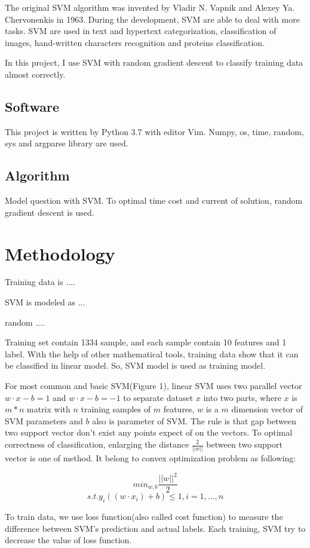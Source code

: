 \documentclass[conference,compsoc]{IEEEtran}
\begin{document}
The original SVM algorithm was invented by Vladir N. Vapnik and
Alexey Ya. Chervonenkis in 1963. During the development, SVM are able to deal
with more tasks. SVM are used in text and hypertext categorization,
classification of images, hand-written characters recognition and proteins
classification.

In this project, I use SVM with random gradient descent to classify training
data almost correctly. 


\subsection{Software}
This project is written by Python 3.7 with editor Vim. Numpy, os, time,
random, sys and argparse library are used.

\subsection{Algorithm}
Model question with SVM. To optimal time cost and current of solution, random
gradient descent is used.

\section{Methodology}
Training data is ....

SVM is modeled as ...

random ....

Training set contain 1334 sample, and each sample contain 10 features and 1
label. With the help of other mathematical tools, training data show that
it can be classified in linear model. So, SVM model is used as training
model.

For most common and basic SVM(Figure 1), linear SVM uses two parallel vector
$w\cdot{x}-b=1$
and $w\cdot{x}-b=-1$ to separate dataset $x$ into two parts, where $x$ is
$m*n$ matrix with $n$ training samples of $m$ features, $w$ is a $m$ dimension
vector of SVM parameters and $b$ also is parameter of SVM. The rule is that gap
between two support vector don't exist any points expect of on the vectors.
To optimal correctness of classification, enlarging the distance
$\frac{2}{||w||}$ between two support vector is one of method. It belong to
convex optimization problem as following:

$${min}_{w,b}\frac{||w||^2}{2}$$
$$s.t. y_i((w\cdot{x_i})+b) \le1, i=1,...,n$$

To train data, we use loss function(also called cost function) to measure the
difference between SVM's prediction and actual labels. Each training, SVM try
to decrease the value of loss function. 
\end{document}
